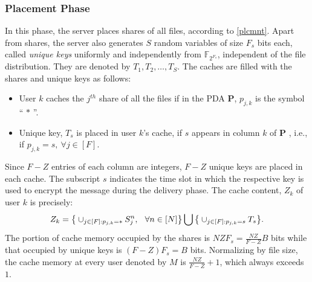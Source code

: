\documentclass[conference]{IEEEtran}
\begin{document}
\subsubsection{Placement Phase}
\label{sec3A} 
In this phase, the server places shares of all files, according to \eqref{plcmnt}. Apart from shares, the server also generates $S$ random variables of size $F_s$ bits each, called \emph{unique keys}  uniformly and independently from $\mathbb{F}_{2^{F_s}}$, independent of the file distribution. They are denoted by $T_{1}, T_{2},\ldots, T_S$. The caches are filled with the shares and unique keys as follows:
\begin{itemize}
	\item User $k$ caches the $j^{th}$ share of all the files if in the PDA $\mathbf{P}$, $p_{j,k}$ is the symbol `` $*$ ''.
	\item Unique key, $T_s$ is placed in user $k$'s cache, if $s$ appears in column $k$ of $\mathbf{P}$ , i.e., if  $p_{j,k}=s, \ \forall j\in[F]$. 
\end{itemize}
Since $F-Z$ entries of each column are integers, $F-Z$ unique keys are placed in each cache. The subscript $s$ indicates the time slot in which the respective key is used to encrypt the message during the delivery phase. The cache content, $Z_k$ of user $k$ is precisely:
\begin{align*}
Z_k=\big\{\cup_{j\in[F]:p_{j,k}=*}S^n_j,\hspace{0.1 in}\forall n\in [N]\big\}\bigcup\big\{\cup_{j\in[F]:p_{j,k}=s}T_s\big\}.
\end{align*}
The portion of cache memory occupied by the shares is $NZF_s=\frac{NZ}{F-Z}B$ bits while that occupied by unique keys is $(F-Z)F_s=B$ bits. Normalizing by file size, the cache memory at every user denoted by $M$ is $\frac{NZ}{F-Z}+1$, which always exceeds $1$.

\end{document}
